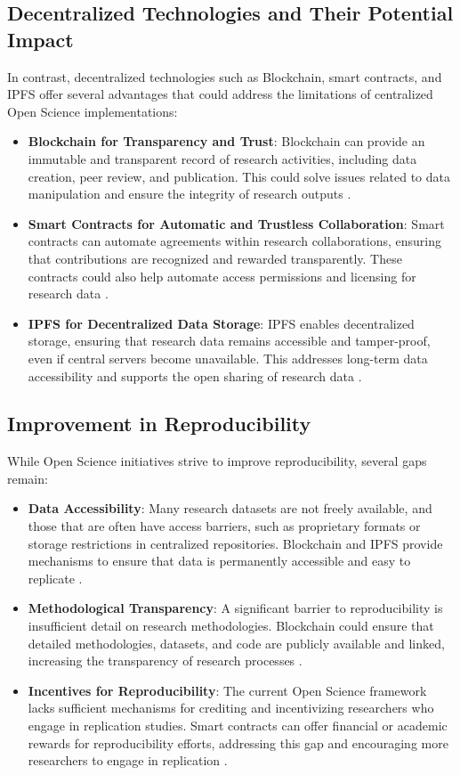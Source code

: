 \documentclass{article}
\begin{document}
\subsection{Decentralized Technologies and Their Potential Impact}
In contrast, decentralized technologies such as Blockchain, smart contracts, and IPFS offer several advantages that could address the limitations of centralized Open Science implementations:
\begin{itemize}
    \item \textbf{Blockchain for Transparency and Trust}: Blockchain can provide an immutable and transparent record of research activities, including data creation, peer review, and publication. This could solve issues related to data manipulation and ensure the integrity of research outputs \cite{Piwowar2011}.
    \item \textbf{Smart Contracts for Automatic and Trustless Collaboration}: Smart contracts can automate agreements within research collaborations, ensuring that contributions are recognized and rewarded transparently. These contracts could also help automate access permissions and licensing for research data \cite{Boulton2015}.
    \item \textbf{IPFS for Decentralized Data Storage}: IPFS enables decentralized storage, ensuring that research data remains accessible and tamper-proof, even if central servers become unavailable. This addresses long-term data accessibility and supports the open sharing of research data \cite{Borgman2012}.
\end{itemize}

\subsection{Improvement in Reproducibility}
While Open Science initiatives strive to improve reproducibility, several gaps remain:
\begin{itemize}
    \item \textbf{Data Accessibility}: Many research datasets are not freely available, and those that are often have access barriers, such as proprietary formats or storage restrictions in centralized repositories. Blockchain and IPFS provide mechanisms to ensure that data is permanently accessible and easy to replicate \cite{Leonelli2016}.
    \item \textbf{Methodological Transparency}: A significant barrier to reproducibility is insufficient detail on research methodologies. Blockchain could ensure that detailed methodologies, datasets, and code are publicly available and linked, increasing the transparency of research processes \cite{Piwowar2011}.
    \item \textbf{Incentives for Reproducibility}: The current Open Science framework lacks sufficient mechanisms for crediting and incentivizing researchers who engage in replication studies. Smart contracts can offer financial or academic rewards for reproducibility efforts, addressing this gap and encouraging more researchers to engage in replication \cite{Nosek2015}.
\end{itemize}
\end{document}
